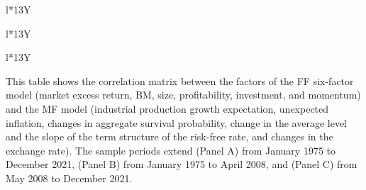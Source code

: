 \documentclass[11pt,halfline,a4paper]{ouparticle}
\begin{document}
\begin{table}[htb!]
  \caption{Correlations}
  \label{tbl:corr}
  \small
  \begin{tabularx}{\linewidth}{l*{13}{Y}}
    \toprule
     \\
    \midrule
  
  \end{tabularx}
\begin{tabularx}{\linewidth}{l*{13}{Y}}
    \toprule
     \\
    \midrule
         
  \end{tabularx}
  \begin{tabularx}{\linewidth}{l*{13}{Y}}
    \toprule
     \\
    \midrule
         
        \cr
    \bottomrule 
  \end{tabularx}
  This table shows the correlation matrix between the factors of the FF six-factor model (market excess return, BM, size, profitability, investment, and momentum) and the MF model (industrial production growth expectation, unexpected inflation, changes in aggregate survival probability, change in the average level and the slope of the term structure of the risk-free rate, and changes in the exchange rate). The sample periods extend (Panel A) from January 1975 to December 2021, (Panel B) from January 1975 to April 2008, and (Panel C) from May 2008 to December 2021.
\end{table}

\newpage
\end{document}
